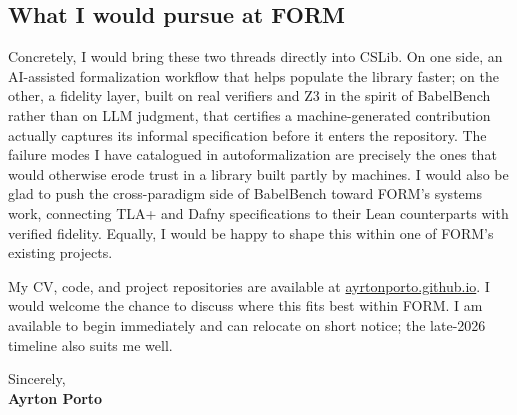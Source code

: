 \documentclass[11pt,a4paper]{article}
\begin{document}
\subsection*{What I would pursue at FORM}

Concretely, I would bring these two threads directly into CSLib. On one side, an AI-assisted formalization workflow that helps populate the library faster; on the other, a fidelity layer, built on real verifiers and Z3 in the spirit of BabelBench rather than on LLM judgment, that certifies a machine-generated contribution actually captures its informal specification before it enters the repository. The failure modes I have catalogued in autoformalization are precisely the ones that would otherwise erode trust in a library built partly by machines. I would also be glad to push the cross-paradigm side of BabelBench toward FORM's systems work, connecting TLA+ and Dafny specifications to their Lean counterparts with verified fidelity. Equally, I would be happy to shape this within one of FORM's existing projects.

My CV, code, and project repositories are available at \href{https://ayrtonporto.github.io}{ayrtonporto.github.io}. I would welcome the chance to discuss where this fits best within FORM. I am available to begin immediately and can relocate on short notice; the late-2026 timeline also suits me well.

\vspace{1em}

Sincerely,\\[1.5em]
\textbf{Ayrton Porto}
\end{document}
